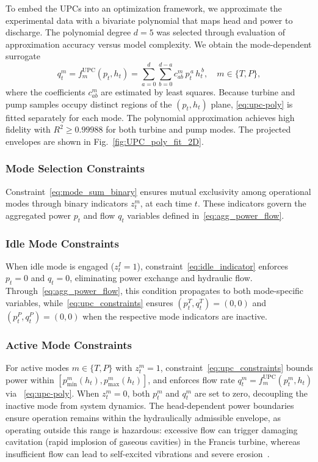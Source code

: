 \documentclass[journal]{IEEEtran}
\begin{document}
To embed the UPCs into an optimization framework, we approximate the experimental data with a bivariate polynomial that maps head and power to discharge. The polynomial degree $d=5$ was selected through evaluation of approximation accuracy versus model complexity. We obtain the mode-dependent surrogate
\begin{equation}
\label{eq:upc-poly}
q_t^{m} = f_m^{\mathrm{UPC}}(p_t,h_t)
=
\sum_{a=0}^{d}\sum_{b=0}^{d-a} c^{m}_{ab}\,p_t^{\,a}\,h_t^{\,b},
\quad m\in\{T,P\},
\end{equation}
where the coefficients $c^{m}_{ab}$ are estimated by least squares. Because turbine and pump samples occupy distinct regions of the $(p_t,h_t)$ plane, \eqref{eq:upc-poly} is fitted separately for each mode. The polynomial approximation achieves high fidelity with $R^2 \geq 0.99988$ for both turbine and pump modes. The projected envelopes are shown in Fig.~\ref{fig:UPC_poly_fit_2D}.

\subsubsection{Mode Selection Constraints}
Constraint~\eqref{eq:mode_sum_binary} ensures mutual exclusivity among operational modes through binary indicators $z_t^m$, at each time $t$. These indicators govern the aggregated power $p_t$ and flow $q_t$ variables defined in~\eqref{eq:agg_power_flow}.

\subsubsection{Idle Mode Constraints}
When idle mode is engaged ($z_t^I=1$), constraint~\eqref{eq:idle_indicator} enforces $p_t=0$ and $q_t=0$, eliminating power exchange and hydraulic flow. Through~\eqref{eq:agg_power_flow}, this condition propagates to both mode-specific variables, while~\eqref{eq:upc_constraints} ensures $(p_t^T, q_t^T) = (0,0)$ and $(p_t^P, q_t^P) = (0,0)$ when the respective mode indicators are inactive.


\subsubsection{Active Mode Constraints}
For active modes $m \in \{T, P\}$ with $z_t^m=1$, constraint~\eqref{eq:upc_constraints} bounds power within $[p_{\min}^m(h_t), p_{\max}^m(h_t)]$, and enforces flow rate $q_t^m = f_m^{\text{UPC}}(p_t^m, h_t)$ via ~\eqref{eq:upc-poly}. When $z_t^m=0$, both $p_t^m$ and $q_t^m$ are set to zero, decoupling the inactive mode from system dynamics. The head-dependent power boundaries ensure operation remains within the hydraulically admissible envelope, as operating outside this range is hazardous: excessive flow can trigger damaging cavitation (rapid implosion of gaseous cavities) in the Francis turbine, whereas insufficient flow can lead to self-excited vibrations and severe erosion~\cite{pannatier2010optimisation}.
\end{document}
